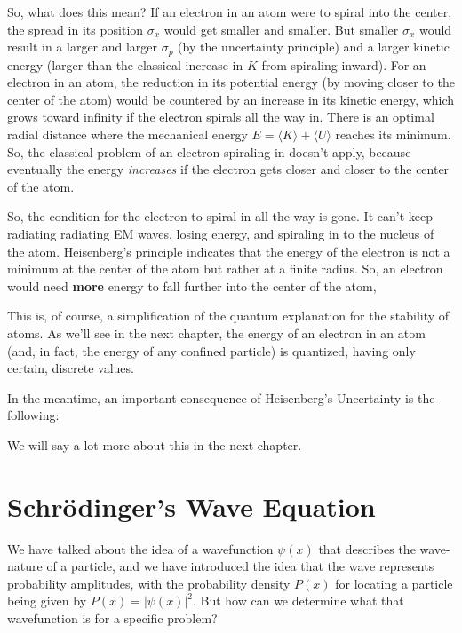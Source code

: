 So, what does this mean? If an electron in an atom were to spiral into
the center, the spread in its position $\sigma_x$ would get smaller
and smaller. But smaller $\sigma_x$ would result in a larger and larger
$\sigma_p$ (by the uncertainty principle) and a larger kinetic energy
(larger than the classical increase in $K$ from spiraling inward). For
an electron in an atom, the reduction in its potential energy (by moving
closer to the center of the atom) would be countered by an increase in
its kinetic energy, which grows toward infinity if the electron spirals
all the way in. There is an optimal radial distance where the mechanical
energy $E = \langle K\rangle + \langle U\rangle$ reaches its minimum.
So, the classical problem of an electron spiraling in doesn't apply,
because eventually the energy {\it increases} if the electron gets closer
and closer to the center of the atom.

So, the condition for the electron to spiral in all the way is gone. It can't
keep radiating radiating EM waves, losing energy, and spiraling in to the
nucleus of the atom. Heisenberg's principle indicates that the energy of the
electron is not a minimum at the center of the atom but rather at
a finite radius. So, an electron would need {\bf more} energy to
fall further into the center of the atom, 

This is, of course, a simplification of the quantum explanation for
the stability of atoms. As we'll see in the next chapter, the energy of
an electron in an atom (and, in fact, the energy of any confined particle)
is quantized, having only certain, discrete values.

In the meantime, an important consequence of Heisenberg's Uncertainty
is the following:  

\break We will say a lot more about this in the
next chapter.

\section{Schr\"odinger's Wave Equation}

We have talked about the idea of a wavefunction $\psi(x)$ that describes
the wave-nature of a particle, and we have introduced the idea that the
wave represents probability amplitudes, with the probability density
$P(x)$ for locating a particle being given by $P(x) = |\psi(x)|^2$. But
how can we determine what that wavefunction is for a specific problem?

